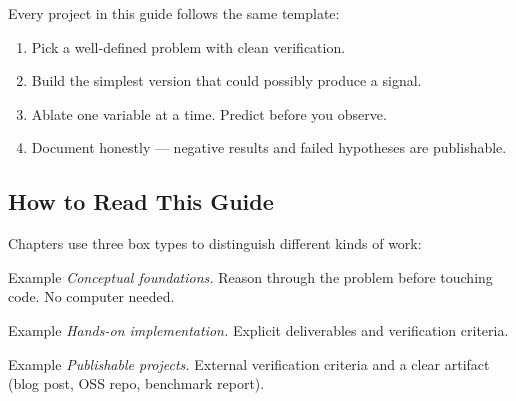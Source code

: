 Every project in this guide follows the same template:

\begin{enumerate}
  \item Pick a well-defined problem with clean verification.
  \item Build the simplest version that could possibly produce a signal.
  \item Ablate one variable at a time. Predict before you observe.
  \item Document honestly --- negative results and failed hypotheses are publishable.
\end{enumerate}


\subsection{How to Read This Guide}

Chapters use three box types to distinguish different kinds of work:

\begin{thinkfirst}{Example}
\textit{Conceptual foundations.} Reason through the problem before touching code. No computer needed.
\end{thinkfirst}

\begin{exercise}{Example}
\textit{Hands-on implementation.} Explicit deliverables and verification criteria.
\end{exercise}

\begin{portfolio}{Example}
\textit{Publishable projects.} External verification criteria and a clear artifact (blog post, OSS repo, benchmark report).
\end{portfolio}

